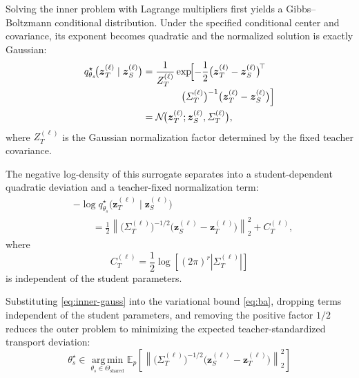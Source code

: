 \documentclass[letterpaper]{article} %
\newcommand{\E}{\mathbb{E}}
\newcommand{\calN}{\mathcal{N}}
\newcommand{\bz}{\boldsymbol{z}}
\newcommand{\bSigma}{\varSigma}
\theoremstyle{plain}
\theoremstyle{definition}
\begin{document}
Solving the inner problem with Lagrange multipliers first yields a Gibbs--Boltzmann conditional distribution. Under the specified conditional center and covariance, its exponent becomes quadratic and the normalized solution is exactly Gaussian:
\begin{equation}
\begin{aligned}
  q^\star_{\theta_s}\!\bigl(
    \bz_T^{(\ell)}
    \mid
    \bz_S^{(\ell)}
  \bigr)
  &=
  \frac{1}{Z_T^{(\ell)}}
  \exp\!\Bigl[
    -\frac{1}{2}
    \bigl(
      \bz_T^{(\ell)}-\bz_S^{(\ell)}
    \bigr)^{\!\top}\\[-2pt]
  &\qquad\qquad
    \bigl(
      \bSigma_T^{(\ell)}
    \bigr)^{-1}
    \bigl(
      \bz_T^{(\ell)}-\bz_S^{(\ell)}
    \bigr)
  \Bigr]\\
  &=
  \calN\!\bigl(
    \bz_T^{(\ell)};
    \bz_S^{(\ell)},
    \bSigma_T^{(\ell)}
  \bigr),
\end{aligned}
\label{eq:inner-gauss}
\end{equation}
where $Z_T^{(\ell)}$ is the Gaussian normalization factor determined by the fixed teacher covariance.

The negative log-density of this surrogate separates into a
student-dependent quadratic deviation and a teacher-fixed normalization term:
\begin{equation}
\begin{aligned}
  &-\log
  q^\star_{\theta_s}\!\bigl(
    \bz_T^{(\ell)}
    \mid
    \bz_S^{(\ell)}
  \bigr)\\
  &\qquad =
  \frac{1}{2}
  \left\|
    \bigl(
      \bSigma_T^{(\ell)}
    \bigr)^{-1/2}
    \bigl(
      \bz_S^{(\ell)}
      -
      \bz_T^{(\ell)}
    \bigr)
  \right\|_2^2
  +
  C_T^{(\ell)},
\end{aligned}
\label{eq:gaussian-nll}
\end{equation}
where
\[
C_T^{(\ell)}
=
\frac{1}{2}
\log\!\left[
  (2\pi)^r
  \left|
    \bSigma_T^{(\ell)}
  \right|
\right]
\]
is independent of the student parameters.

Substituting \eqref{eq:inner-gauss} into the variational bound \eqref{eq:ba}, dropping terms independent of the student parameters, and removing the positive factor $1/2$ reduces the outer problem to minimizing the expected teacher-standardized transport deviation:
\begin{equation}
  \theta_s^\star
  \in
  \operatorname*{arg\,min}_{\theta_s\in\Theta_{\mathrm{shared}}}
  \E_p\!\left[
    \left\|
      \bigl(
        \bSigma_T^{(\ell)}
      \bigr)^{-1/2}
      \bigl(
        \bz_S^{(\ell)}
        -
        \bz_T^{(\ell)}
      \bigr)
    \right\|_2^2
  \right]
\label{eq:outer-reduction}
\end{equation}
\end{document}
